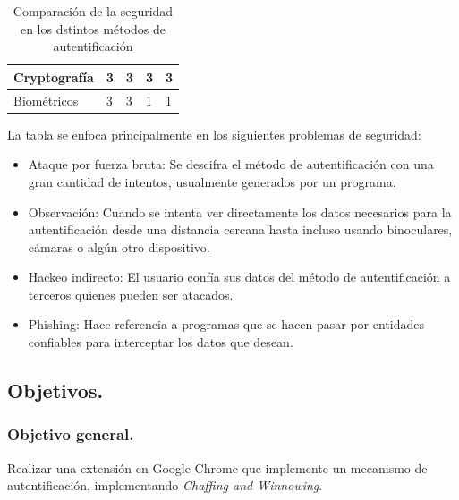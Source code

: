 \documentclass[12pt, a4paper, titlepage]{article}
\begin{document}
\begin{table}[htb]
{\begin{tabular}{l|l|l|l|l|}
						\multicolumn{1}{|l|}{Cryptografía}                                                     & 3                                                                 & 3           & 3                                                          & 3        \\ \hline
						\multicolumn{1}{|l|}{Biométricos}                                                      & 3                                                                 & 3           & 1                                                          & 1        \\ \hline
					\end{tabular}
				}
			\caption{Comparación de la seguridad en los dstintos métodos de autentificación}
			\end{table}
		La tabla se enfoca principalmente en los siguientes problemas de seguridad: 
		
		\begin{itemize}
			\item Ataque por fuerza bruta: Se descifra el método de autentificación con una gran cantidad de intentos, usualmente generados por un programa.
			\item Observación: Cuando se intenta ver directamente los datos necesarios para la autentificación desde una distancia cercana hasta incluso usando binoculares, cámaras o algún otro dispositivo.
			\item Hackeo indirecto: El usuario confía sus datos del método de autentificación a terceros quienes pueden ser atacados. 
			\item Phishing: Hace referencia a programas que se hacen pasar por entidades confiables para interceptar los datos que desean.
		\end{itemize}
			
	\newpage
		\subsection{Objetivos.}
			\subsubsection{Objetivo general. \\}
			Realizar una extensión en Google Chrome que implemente un mecanismo de autentificación, implementando \textit{Chaffing and Winnowing}.\\
\end{document}
